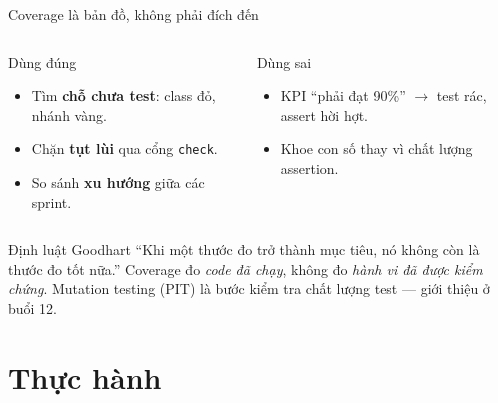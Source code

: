 \documentclass[aspectratio=169,12pt]{beamer}
\begin{document}
\begin{frame}{Coverage là bản đồ, không phải đích đến}
  \begin{columns}[T]
    \begin{block}{Dùng đúng}
      \begin{itemize}
        \item \small Tìm \textbf{chỗ chưa test}: class đỏ,
              nhánh vàng.
        \item \small Chặn \textbf{tụt lùi} qua cổng \texttt{check}.
        \item \small So sánh \textbf{xu hướng} giữa các sprint.
      \end{itemize}
    \end{block}

    \begin{alertblock}{Dùng sai}
      \begin{itemize}
        \item \small KPI ``phải đạt 90\%'' $\to$ test rác,
              assert hời hợt.
        \item \small Khoe con số thay vì chất lượng assertion.
      \end{itemize}
    \end{alertblock}
  \end{columns}

  \vspace{0.4em}
  \begin{exampleblock}{Định luật Goodhart}
    ``Khi một thước đo trở thành mục tiêu, nó không còn là thước đo
    tốt nữa.'' Coverage đo \textit{code đã chạy}, không đo
    \textit{hành vi đã được kiểm chứng}. Mutation testing (PIT)
    là bước kiểm tra chất lượng test --- giới thiệu ở buổi 12.
  \end{exampleblock}
\end{frame}

\section{Thực hành}
\end{document}
